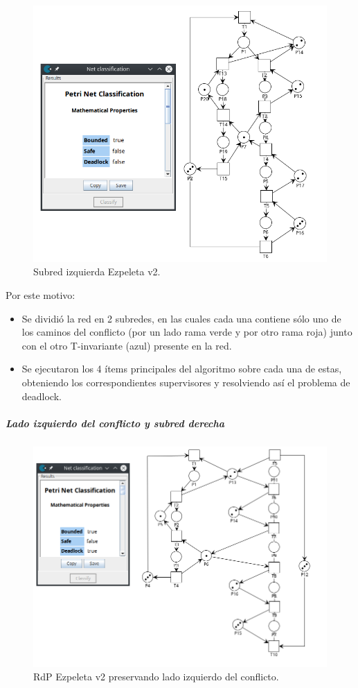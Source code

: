 \begin{figure}[H]
	\centering
	\includegraphics[width=\textwidth]{Figures/algoritmo3/ezpeletav22.png}
	\caption{Subred izquierda Ezpeleta v2.}
	\label{fig:subredizq_ezpeletav2}
 \end{figure}
\bigskip

Por este motivo:
\begin{itemize}
    \item Se dividió la red en 2 subredes, en las cuales cada una contiene sólo uno de los caminos del conflicto (por un lado rama verde y por otro rama roja) junto con el otro T-invariante (azul) presente en la red.
    \item Se ejecutaron los 4 ítems principales del algoritmo sobre cada una de estas, obteniendo los correspondientes supervisores y resolviendo así el problema de deadlock.
\end{itemize}

\newpage
\subparagraph{Lado izquierdo del conflicto y subred derecha}
\hfill
\begin{figure}[H]
	\centering
	\includegraphics[scale=0.625]{Figures/algoritmo3/ezpeletav23.png}
	\caption{RdP Ezpeleta v2 preservando lado izquierdo del conflicto.}
	\label{fig:conflictoizq_ezpeletav2}
 \end{figure}


